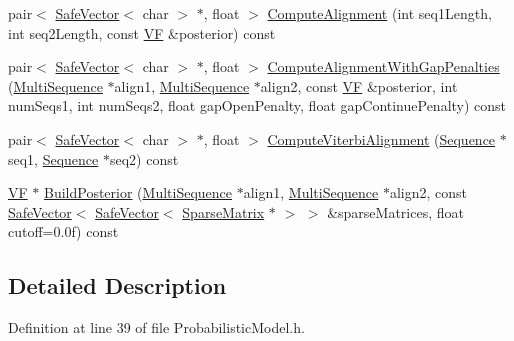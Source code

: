 \begin{DoxyCompactItemize}
\item 
pair$<$ \hyperlink{class_p_r_o_b_c_o_n_s_1_1_safe_vector}{Safe\+Vector}$<$ char $>$ $\ast$, float $>$ \hyperlink{class_p_r_o_b_c_o_n_s_1_1_probabilistic_model_a9233c1d04f152e972f33b311cc3e734f}{Compute\+Alignment} (int seq1\+Length, int seq2\+Length, const \hyperlink{namespace_p_r_o_b_c_o_n_s_a7d46b91dfef3fa4038545a492ad12221}{V\+F} \&posterior) const 
\item 
pair$<$ \hyperlink{class_p_r_o_b_c_o_n_s_1_1_safe_vector}{Safe\+Vector}$<$ char $>$ $\ast$, float $>$ \hyperlink{class_p_r_o_b_c_o_n_s_1_1_probabilistic_model_a67de41318f83963dbb18344c13922362}{Compute\+Alignment\+With\+Gap\+Penalties} (\hyperlink{class_p_r_o_b_c_o_n_s_1_1_multi_sequence}{Multi\+Sequence} $\ast$align1, \hyperlink{class_p_r_o_b_c_o_n_s_1_1_multi_sequence}{Multi\+Sequence} $\ast$align2, const \hyperlink{namespace_p_r_o_b_c_o_n_s_a7d46b91dfef3fa4038545a492ad12221}{V\+F} \&posterior, int num\+Seqs1, int num\+Seqs2, float gap\+Open\+Penalty, float gap\+Continue\+Penalty) const 
\item 
pair$<$ \hyperlink{class_p_r_o_b_c_o_n_s_1_1_safe_vector}{Safe\+Vector}$<$ char $>$ $\ast$, float $>$ \hyperlink{class_p_r_o_b_c_o_n_s_1_1_probabilistic_model_a0a97c9cbf1a085021d5f9c432e292847}{Compute\+Viterbi\+Alignment} (\hyperlink{class_p_r_o_b_c_o_n_s_1_1_sequence}{Sequence} $\ast$seq1, \hyperlink{class_p_r_o_b_c_o_n_s_1_1_sequence}{Sequence} $\ast$seq2) const 
\item 
\hyperlink{namespace_p_r_o_b_c_o_n_s_a7d46b91dfef3fa4038545a492ad12221}{V\+F} $\ast$ \hyperlink{class_p_r_o_b_c_o_n_s_1_1_probabilistic_model_a6c9642a3fe71c427a54d5edceeaedcba}{Build\+Posterior} (\hyperlink{class_p_r_o_b_c_o_n_s_1_1_multi_sequence}{Multi\+Sequence} $\ast$align1, \hyperlink{class_p_r_o_b_c_o_n_s_1_1_multi_sequence}{Multi\+Sequence} $\ast$align2, const \hyperlink{class_p_r_o_b_c_o_n_s_1_1_safe_vector}{Safe\+Vector}$<$ \hyperlink{class_p_r_o_b_c_o_n_s_1_1_safe_vector}{Safe\+Vector}$<$ \hyperlink{class_p_r_o_b_c_o_n_s_1_1_sparse_matrix}{Sparse\+Matrix} $\ast$ $>$ $>$ \&sparse\+Matrices, float cutoff=0.\+0f) const 
\end{DoxyCompactItemize}


\subsection{Detailed Description}


Definition at line 39 of file Probabilistic\+Model.\+h.



